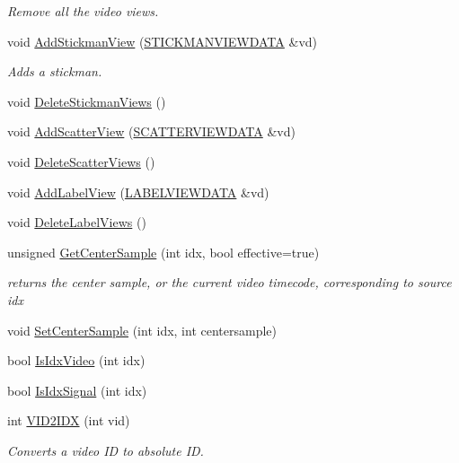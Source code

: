 \begin{CompactItemize}
\begin{CompactList}\small\item\em Remove all the video views. \item\end{CompactList}\item 
void \hyperlink{class_main_window_b99b9d225edf064237e57bb35a654110}{AddStickmanView} (\hyperlink{class_s_t_i_c_k_m_a_n_v_i_e_w_d_a_t_a}{STICKMANVIEWDATA} \&vd)
\begin{CompactList}\small\item\em Adds a stickman. \item\end{CompactList}\item 
void \hyperlink{class_main_window_78b58b233232182d665630724c389722}{DeleteStickmanViews} ()
\item 
void \hyperlink{class_main_window_d7843a6272ce3e6ca47648a2ea3916c0}{AddScatterView} (\hyperlink{class_s_c_a_t_t_e_r_v_i_e_w_d_a_t_a}{SCATTERVIEWDATA} \&vd)
\item 
void \hyperlink{class_main_window_6147ba7241a82f7392cc5a542d76047f}{DeleteScatterViews} ()
\item 
void \hyperlink{class_main_window_a1f10b2834cc0664f8a9af0bb07b55b9}{AddLabelView} (\hyperlink{class_l_a_b_e_l_v_i_e_w_d_a_t_a}{LABELVIEWDATA} \&vd)
\item 
void \hyperlink{class_main_window_53f90a91aeb11d41d7d7015ff660ddc8}{DeleteLabelViews} ()
\item 
unsigned \hyperlink{class_main_window_2213846510c8b8ad79f1e238d4b9d123}{GetCenterSample} (int idx, bool effective=true)
\begin{CompactList}\small\item\em returns the center sample, or the current video timecode, corresponding to source idx \item\end{CompactList}\item 
void \hyperlink{class_main_window_72ed8503fa9460d9ea40f02402d1a03b}{SetCenterSample} (int idx, int centersample)
\item 
bool \hyperlink{class_main_window_b8b412425029ced77c6603e33582dd7c}{IsIdxVideo} (int idx)
\item 
bool \hyperlink{class_main_window_fbeb66a077c76bfc5b4b2c7a46a063e1}{IsIdxSignal} (int idx)
\item 
int \hyperlink{class_main_window_556708726e6100f4a1a1ceb435988246}{VID2IDX} (int vid)
\begin{CompactList}\small\item\em Converts a video ID to absolute ID. \item\end{CompactList}\item 

\end{CompactItemize}

